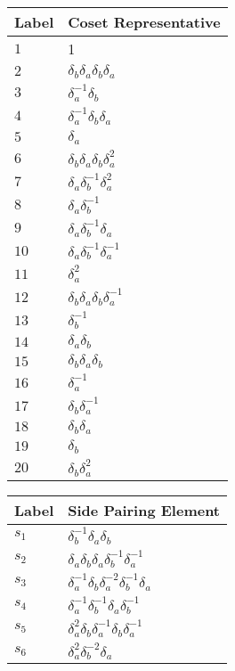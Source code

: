 \documentclass{article}
\begin{document}
\begin{center}
\begin{tabular}{ll}
\toprule
Label & Coset Representative\\
\midrule
$1$ & 1 \\
$2$ & $\delta_b^{}\delta_a^{}\delta_b^{}\delta_a^{}$ \\
$3$ & $\delta_a^{-1}\delta_b^{}$ \\
$4$ & $\delta_a^{-1}\delta_b^{}\delta_a^{}$ \\
$5$ & $\delta_a^{}$ \\
$6$ & $\delta_b^{}\delta_a^{}\delta_b^{}\delta_a^{2}$ \\
$7$ & $\delta_a^{}\delta_b^{-1}\delta_a^{2}$ \\
$8$ & $\delta_a^{}\delta_b^{-1}$ \\
$9$ & $\delta_a^{}\delta_b^{-1}\delta_a^{}$ \\
$10$ & $\delta_a^{}\delta_b^{-1}\delta_a^{-1}$ \\
$11$ & $\delta_a^{2}$ \\
$12$ & $\delta_b^{}\delta_a^{}\delta_b^{}\delta_a^{-1}$ \\
$13$ & $\delta_b^{-1}$ \\
$14$ & $\delta_a^{}\delta_b^{}$ \\
$15$ & $\delta_b^{}\delta_a^{}\delta_b^{}$ \\
$16$ & $\delta_a^{-1}$ \\
$17$ & $\delta_b^{}\delta_a^{-1}$ \\
$18$ & $\delta_b^{}\delta_a^{}$ \\
$19$ & $\delta_b^{}$ \\
$20$ & $\delta_b^{}\delta_a^{2}$ \\
\bottomrule
\end{tabular}
\hfill
\begin{tabular}{ll}
\toprule
Label & Side Pairing Element\\
\midrule
$s_{1}$ & $\delta_b^{-1}\delta_a^{}\delta_b^{}$ \\
$s_{2}$ & $\delta_a^{}\delta_b^{}\delta_a^{}\delta_b^{-1}\delta_a^{-1}$ \\
$s_{3}$ & $\delta_a^{-1}\delta_b^{}\delta_a^{-2}\delta_b^{-1}\delta_a^{}$ \\
$s_{4}$ & $\delta_a^{-1}\delta_b^{-1}\delta_a^{}\delta_b^{-1}$ \\
$s_{5}$ & $\delta_a^{2}\delta_b^{}\delta_a^{-1}\delta_b^{}\delta_a^{-1}$ \\
$s_{6}$ & $\delta_a^{2}\delta_b^{-2}\delta_a^{}$ \\

\end{tabular}
\end{center}
\end{document}
